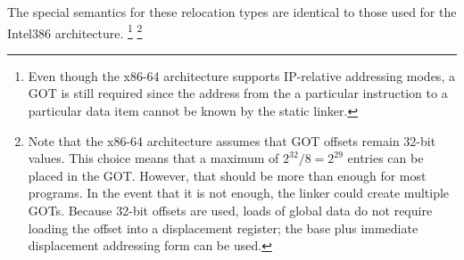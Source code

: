 The special semantics for these relocation types are identical to
those used for the Intel386 architecture.
\footnote{Even though the x86-64 architecture supports IP-relative
  addressing modes, a GOT is still required since the address from the
  a particular instruction to a particular data item cannot be
  known by the static linker.}
\footnote{Note that the
  x86-64 architecture assumes that GOT offsets remain 32-bit values.
  This choice means that a maximum of $2^{32}/8 = 2^{29}$ entries can
  be placed in the GOT.  However, that should be more than enough for
  most programs.  In the event that it is not enough, the linker could
  create multiple GOTs.  Because 32-bit offsets are used, loads of
  global data do not require loading the offset into a displacement
  register; the base plus immediate displacement addressing form can
  be used.}

